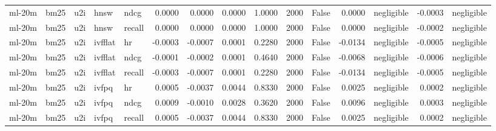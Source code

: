 \begin{tabular}{lllllrrrrrrrlrl}
ml-20m & bm25 & u2i & hnsw & ndcg & 0.0000 & 0.0000 & 0.0000 & 1.0000 & 2000 & False & 0.0000 & negligible & -0.0003 & negligible \\
ml-20m & bm25 & u2i & hnsw & recall & 0.0000 & 0.0000 & 0.0000 & 1.0000 & 2000 & False & 0.0000 & negligible & -0.0002 & negligible \\
ml-20m & bm25 & u2i & ivfflat & hr & -0.0003 & -0.0007 & 0.0001 & 0.2280 & 2000 & False & -0.0134 & negligible & -0.0005 & negligible \\
ml-20m & bm25 & u2i & ivfflat & ndcg & -0.0001 & -0.0002 & 0.0001 & 0.4640 & 2000 & False & -0.0068 & negligible & -0.0006 & negligible \\
ml-20m & bm25 & u2i & ivfflat & recall & -0.0003 & -0.0007 & 0.0001 & 0.2280 & 2000 & False & -0.0134 & negligible & -0.0005 & negligible \\
ml-20m & bm25 & u2i & ivfpq & hr & 0.0005 & -0.0037 & 0.0044 & 0.8330 & 2000 & False & 0.0025 & negligible & 0.0002 & negligible \\
ml-20m & bm25 & u2i & ivfpq & ndcg & 0.0009 & -0.0010 & 0.0028 & 0.3620 & 2000 & False & 0.0096 & negligible & 0.0003 & negligible \\
ml-20m & bm25 & u2i & ivfpq & recall & 0.0005 & -0.0037 & 0.0044 & 0.8330 & 2000 & False & 0.0025 & negligible & 0.0002 & negligible \\
\bottomrule
\end{tabular}

